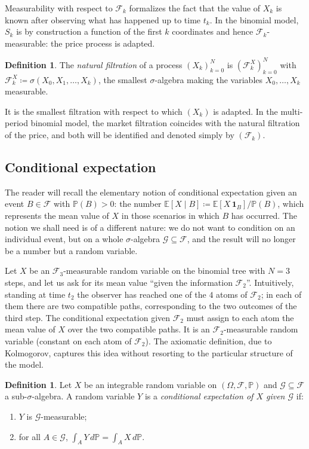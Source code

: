 \documentclass[11pt,a4paper,oneside]{report}
\theoremstyle{plain}
\theoremstyle{definition}
\newtheorem{definicion}[teorema]{Definition}
\theoremstyle{remark}
\newcommand{\E}{\mathbb{E}}
\newcommand{\PP}{\mathbb{P}}
\newcommand{\F}{\mathcal{F}}
\newcommand{\G}{\mathcal{G}}
\newcommand{\1}{\mathbf{1}}
\newcommand{\eqdef}{\coloneqq}
\begin{document}
Measurability with respect to $\F_k$ formalizes the fact that the
value of $X_k$ is known after observing what has happened up to time
$t_k$. In the binomial model, $S_k$ is by construction a function of
the first $k$ coordinates and hence $\F_k$-measurable: the price
process is adapted.

\medskip

\begin{definicion}
\label{def:filtracion_natural}
The \emph{natural filtration} of a process $(X_k)_{k=0}^{N}$ is
$(\F_k^X)_{k=0}^{N}$ with $\F_k^X \eqdef \sigma(X_0, X_1, \ldots, X_k)$,
the smallest $\sigma$-algebra making the variables $X_0, \ldots, X_k$
measurable.
\end{definicion}

It is the smallest filtration with respect to which $(X_k)$ is
adapted. In the multi-period binomial model, the market filtration
coincides with the natural filtration of the price, and both will be
identified and denoted simply by $(\F_k)$.

\subsection{Conditional expectation}
\label{subsec:esperanza_condicional}

The reader will recall the
elementary notion of conditional expectation given an event $B \in \F$
with $\PP(B) > 0$: the number $\E[X \mid B] \eqdef \E[X\, \1_B]/\PP(B)$,
which represents the mean value of $X$ in those scenarios in which
$B$ has occurred. The notion we shall need is of a different nature:
we do not want to condition on an individual event, but on a whole
$\sigma$-algebra $\G \subseteq \F$, and the result will no longer be a
number but a random variable.

Let $X$ be an
$\F_3$-measurable random variable on the binomial tree with $N = 3$
steps, and let us ask for its mean value ``given the information
$\F_2$''. Intuitively, standing at time $t_2$ the observer has reached
one of the $4$ atoms of $\F_2$; in each of them there are two
compatible paths, corresponding to the two outcomes of the third
step. The conditional expectation given $\F_2$ must assign to each
atom the mean value of $X$ over the two compatible paths. It is an
$\F_2$-measurable random variable (constant on each atom of $\F_2$).
The axiomatic definition, due to Kolmogorov, captures this idea without resorting to the
particular structure of the model.

\begin{definicion}
\label{def:esperanza_condicional}
Let $X$ be an integrable random variable on $(\Omega, \F, \PP)$ and
$\G \subseteq \F$ a sub-$\sigma$-algebra. A random variable $Y$ is a
\emph{conditional expectation of $X$ given $\G$} if:
\begin{enumerate}[label=\textnormal{(\roman*)}]
  \item $Y$ is $\G$-measurable;
  \item for all $A \in \G$, $\displaystyle \int_A Y \, d\PP = \int_A X \, d\PP$.
\end{enumerate}
\end{definicion}
\end{document}
